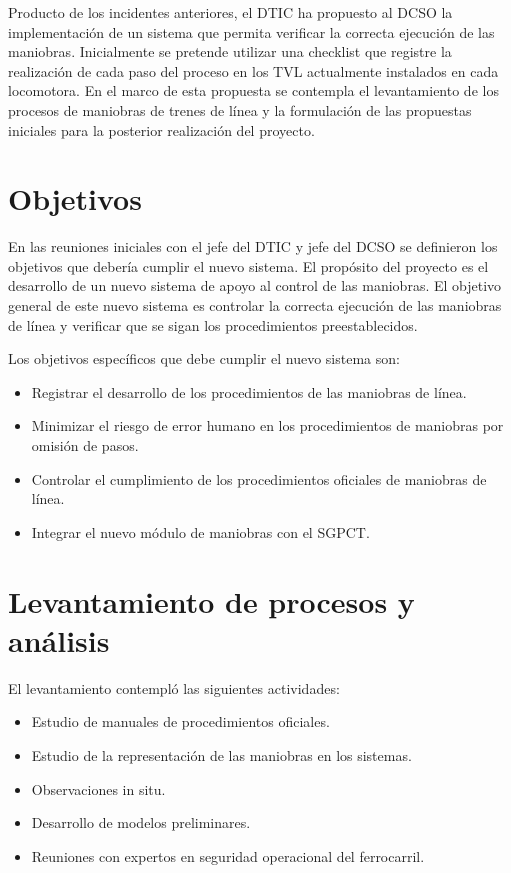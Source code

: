 \documentclass[oneside,12pt, letterpaper, titlepage]{book}
\begin{document}
Producto de los incidentes anteriores, el DTIC ha propuesto al DCSO la implementación de un sistema que permita verificar la correcta ejecución de las maniobras. Inicialmente se pretende utilizar una checklist que registre la realización de cada paso del proceso en los TVL actualmente instalados en cada locomotora. En el marco de esta propuesta se contempla el levantamiento de los procesos de maniobras de trenes de línea y la formulación de las propuestas iniciales para la posterior realización del proyecto.

\section{Objetivos}
En las reuniones iniciales con el jefe del DTIC y jefe del DCSO se definieron los objetivos que debería cumplir el nuevo sistema. El propósito del proyecto es el desarrollo de un nuevo sistema de apoyo al control de las maniobras. El objetivo general de este nuevo sistema es controlar la correcta ejecución de las maniobras de línea y verificar que se sigan los procedimientos preestablecidos.

Los objetivos específicos que debe cumplir el nuevo sistema son:
\begin{itemize}
\item Registrar el desarrollo de los procedimientos de las maniobras de línea.
\item Minimizar el riesgo de error humano en los procedimientos de maniobras por omisión de pasos.
\item Controlar el cumplimiento de los procedimientos oficiales de maniobras de línea.
\item Integrar el nuevo módulo de maniobras con el SGPCT.
\end{itemize}

\section{Levantamiento de procesos y análisis}
El levantamiento contempló las siguientes actividades:

\begin{itemize}
\item Estudio de manuales de procedimientos oficiales.
\item Estudio de la representación de las maniobras en los sistemas.
\item Observaciones in situ.
\item Desarrollo de modelos preliminares.
\item Reuniones con expertos en seguridad operacional del ferrocarril.
\end{itemize}
\end{document}
